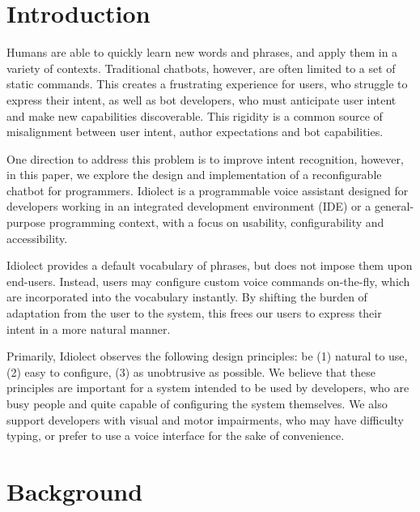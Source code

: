 \documentclass{article}
\theoremstyle{plain}
\theoremstyle{definition}
\theoremstyle{remark}
\begin{document}
\section{Introduction}

Humans are able to quickly learn new words and phrases, and apply them in a variety of contexts. Traditional chatbots, however, are often limited to a set of static commands. This creates a frustrating experience for users, who struggle to express their intent, as well as bot developers, who must anticipate user intent and make new capabilities discoverable. This rigidity is a common source of misalignment between user intent, author expectations and bot capabilities.

One direction to address this problem is to improve intent recognition, however, in this paper, we explore the design and implementation of a reconfigurable chatbot for programmers. Idiolect is a programmable voice assistant designed for developers working in an integrated development environment (IDE) or a general-purpose programming context, with a focus on usability, configurability and accessibility.

Idiolect provides a default vocabulary of phrases, but does not impose them upon end-users. Instead, users may configure custom voice commands on-the-fly, which are incorporated into the vocabulary instantly. By shifting the burden of adaptation from the user to the system, this frees our users to express their intent in a more natural manner.

Primarily, Idiolect observes the following design principles: be (1) natural to use, (2) easy to configure, (3) as unobtrusive as possible. We believe that these principles are important for a system intended to be used by developers, who are busy people and quite capable of configuring the system themselves. We also support developers with visual and motor impairments, who may have difficulty typing, or prefer to use a voice interface for the sake of convenience.

\section{Background}

\end{document}
